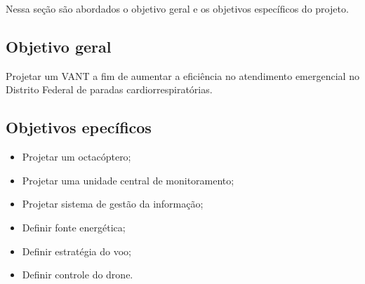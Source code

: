 Nessa seção são abordados o objetivo geral e os objetivos específicos do projeto.
\subsection{Objetivo geral}
Projetar um VANT a fim de aumentar a eficiência no atendimento emergencial no Distrito Federal de paradas cardiorrespiratórias.

\subsection{Objetivos epecíficos}
\begin{itemize}
  \item Projetar um octacóptero;
  \item Projetar uma unidade central de monitoramento;
	\item Projetar sistema de gestão da informação;
	\item Definir fonte energética;
	\item Definir estratégia do voo;
	\item Definir controle do drone.
\end{itemize}

